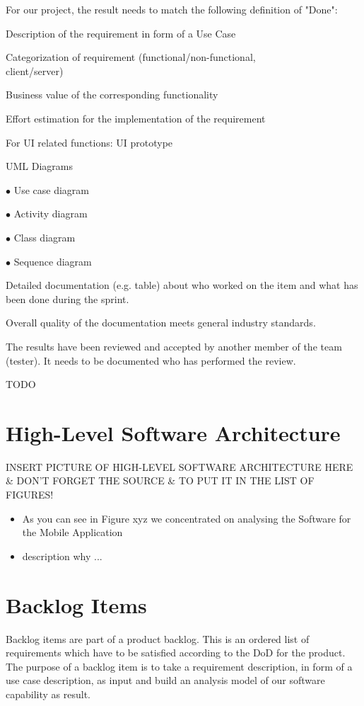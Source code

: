 \documentclass[a4paper, 12pt]{article}
\begin{document}
For our project, the result needs to match the following definition of "Done":
\begin{todolist}

\item Description of the requirement in form of a Use Case
\item Categorization of requirement (functional/non-functional,\\
      client/server)
\item Business value of the corresponding functionality
\item Effort estimation for the implementation of the requirement
\item For UI related functions: UI prototype
\item UML Diagrams 

    $\bullet$ Use case diagram
    
    $\bullet$ Activity diagram
    
    $\bullet$ Class diagram
    
    $\bullet$ Sequence diagram
    
\item Detailed documentation (e.g. table) about who worked on the item and what has been done during the sprint.
\item Overall quality of the documentation meets general industry standards.
\item The results have been reviewed and accepted by another member of the team (tester). It needs to be documented who has performed the review.

\end{todolist}
\color{red}TODO
\section{High-Level Software Architecture }
INSERT PICTURE OF HIGH-LEVEL SOFTWARE ARCHITECTURE HERE \& DON'T FORGET THE SOURCE \& TO PUT IT IN THE LIST OF FIGURES!
\begin{itemize}
\item As you can see in Figure xyz we concentrated on analysing the Software for the Mobile Application
\item description why ...
\color{black}
\end{itemize}

\section{Backlog Items}
Backlog items are part of a product backlog. This is an ordered list of requirements which have to be satisfied according to the DoD for the product. The purpose of a backlog item is to take a requirement description, in form of a use case description, as input and build an analysis model of our software capability as result.
\end{document}
